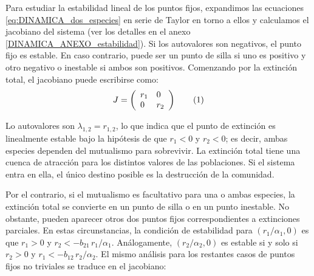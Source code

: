 Para estudiar la estabilidad lineal de los puntos fijos, expandimos las ecuaciones \ref{eq:DINAMICA_dos_especies} en serie de Taylor en torno a ellos y calculamos el jacobiano del sistema (ver los detalles en el anexo \ref{DINAMICA_ANEXO_estabilidad}). Si los autovalores son negativos, el punto fijo es estable. En caso contrario, puede ser un punto de silla si uno es positivo y otro negativo o inestable si ambos son positivos. Comenzando por la extinción total, el jacobiano puede escribirse como: 
\begin{equation}
J = \left(
\begin{array}{ll}
r_{1}   & 0 \\
0 & r_{2} 
\end{array}
\right) \stepcounter{equation}\tag{\theequation}\label{eq:J00}
\end{equation}

Lo autovalores son $\lambda_{1,2} = r_{1,2}$, lo que indica que el punto de extinción es linealmente estable bajo la hipótesis de que $r_{1}<0$ y $r_{2}<0$; es decir, ambas especies dependen del mutualismo para sobrevivir. La extinción total tiene una cuenca de atracción para los distintos valores de las poblaciones. Si el sistema entra en ella, el único destino posible es la destrucción de la comunidad.

Por el contrario, si el mutualismo es facultativo para una o ambas especies, la extinción total se convierte en un punto de silla o en un punto inestable. No obstante, pueden aparecer otros dos puntos fijos correspondientes a extinciones parciales. En estas circunstancias, la condición de estabilidad para $(r_1/\alpha_1, 0)$ es que $r_{1}>0$ y $r_{2}<-b_{21}\, r_{1}/\alpha_{1}$. Análogamente, $(r_2/\alpha_2, 0)$ es estable si y solo si  $r_{2}>0$ y $r_{1}<-b_{12}\, r_{2}/\alpha_{2}$.
El mismo análisis para los restantes casos de puntos fijos no triviales se traduce en el jacobiano:

